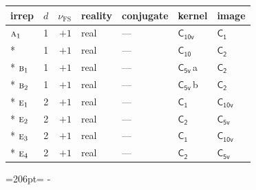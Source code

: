 \documentclass[10pt,a4paper]{article}
\newcommand{\needspace}[1]{\par\penalty-100\begingroup\dimen0=#1\relax\dimen2=\pagegoal
  \advance\dimen2-\pagetotal\ifdim\dimen0>\dimen2\relax\ifdim\dimen2>0pt\vfil\break\fi\fi
  \endgroup}
\numberwithin{equation}{section}
\newcommand{\grp}[1]{\mathsf{#1}}
\newcommand{\irr}[1]{\text{\normalfont\scshape #1}}
\newcommand{\detbox}[1]{{\setlength{\fboxsep}{1pt}\fbox{#1}}}
\newcommand{\clsletter}[1]{\,{\scriptsize\color{black!55}#1}}
\newcommand{\fsind}{\nu_{\mathrm{FS}}}
\begin{document}
{\small\renewcommand{\arraystretch}{1.25}\begin{longtable}{@{}lrrllll@{}}\toprule
irrep & $d$ & $\fsind$ & reality & conjugate & kernel & image\\\midrule\endhead
\bottomrule\endfoot\endlastfoot
$\irr{a}_{1}$ & 1 & $+1$ & real & --- & \href{C10v.pdf}{$\grp{C_{10v}}$} & \href{C1.pdf}{$\grp{C_{1}}$}\\*
\detbox{$\irr{a}_{2}$} & 1 & $+1$ & real & --- & \href{C10.pdf}{$\grp{C_{10}}$} & \href{C2.pdf}{$\grp{C_{2}}$}\\*
$\irr{b}_{1}$ & 1 & $+1$ & real & --- & \href{C5v.pdf}{$\grp{C_{5v}}$}\clsletter{a} & \href{C2.pdf}{$\grp{C_{2}}$}\\*
$\irr{b}_{2}$ & 1 & $+1$ & real & --- & \href{C5v.pdf}{$\grp{C_{5v}}$}\clsletter{b} & \href{C2.pdf}{$\grp{C_{2}}$}\\*
$\irr{e}_{1}$ & 2 & $+1$ & real & --- & \href{C1.pdf}{$\grp{C_{1}}$} & \href{C10v.pdf}{$\grp{C_{10v}}$}\\*
$\irr{e}_{2}$ & 2 & $+1$ & real & --- & \href{C2.pdf}{$\grp{C_{2}}$} & \href{C5v.pdf}{$\grp{C_{5v}}$}\\*
$\irr{e}_{3}$ & 2 & $+1$ & real & --- & \href{C1.pdf}{$\grp{C_{1}}$} & \href{C10v.pdf}{$\grp{C_{10v}}$}\\*
$\irr{e}_{4}$ & 2 & $+1$ & real & --- & \href{C2.pdf}{$\grp{C_{2}}$} & \href{C5v.pdf}{$\grp{C_{5v}}$}\\
\bottomrule\end{longtable}}
\needspace{206pt}
\end{document}
